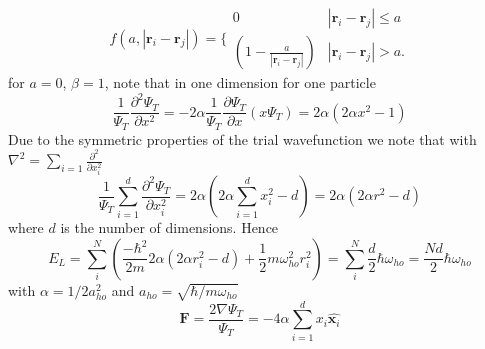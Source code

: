 \documentclass[a4paper, 10pt, english]{revtex4-2} %
\newcommand{\parder}[2]{\frac{\partial #1}{\partial #2}}
\newcommand{\dder}[2]{\frac{\partial^2 #1}{\partial #2^2}}
\begin{document}
    \begin{equation}
            f(a,|\mathbf{r}_i-\mathbf{r}_j|)=\Bigg\{
        \begin{array}{ll}
            0 & {|\mathbf{r}_i-\mathbf{r}_j|} \leq {a}\\
            (1-\frac{a}{|\mathbf{r}_i-\mathbf{r}_j|}) & {|\mathbf{r}_i-\mathbf{r}_j|} > {a}.
        \end{array}
    \end{equation}
    for $a=0$, $\beta = 1$, note that in one dimension for one particle
    \begin{equation}
            \frac{1}{\Psi_T}\dder{\Psi_T}{x}
        =   -2\alpha\frac{1}{\Psi_T}\parder{\Psi_T}{x}\left(x\Psi_T\right)
        =   2\alpha{\left(2\alpha x^2 - 1\right)}
    \end{equation}
    Due to the symmetric properties of the trial wavefunction we note that with $\nabla^2 = \sum_{i=1}\dder{}{x_i}$
    \begin{equation}
            \frac{1}{\Psi_T} \sum_{i=1}^d \dder{\Psi_T}{x_i}
        =   2\alpha\left(2\alpha\sum_{i=1}^dx_i^2 - d\right)
        =   2\alpha\left(2\alpha r^2 - d\right)
    \end{equation}
    where $d$ is the number of dimensions. Hence
    \begin{equation}
            E_L
        =   \sum_i^N\left(\frac{-\hbar^2}{2m}2\alpha\left(2\alpha r_i^2 - d\right) + \frac{1}{2}m\omega_{ho}^2r_i^2\right)
        =   \sum_i^N\frac{d}{2}\hbar\omega_{ho}
        =   \frac{Nd}{2}\hbar\omega_{ho}
    \end{equation}
    with $\alpha = 1/2a_{ho}^2$ and $a_{ho} = \sqrt{\hbar/m\omega_{ho}}$
    \begin{equation}
            \mathbf{F}
        =   \frac{2\nabla \Psi_T}{\Psi_T}
        =   -4\alpha \sum_{i=1}^d x_i \hat{\mathbf{x}_i}
    \end{equation}
\end{document}
